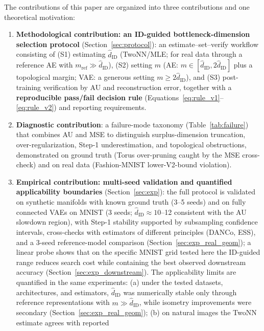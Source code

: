 \documentclass[make,article,submit,pdftex,moreauthors]{Definitions/mdpi}
\newcommand{\hatdID}{\hat{d}_{\mathrm{ID}}}
\begin{document}
The contributions of this paper are organized into three contributions and
one theoretical motivation:
\begin{enumerate}
  \item \textbf{Methodological contribution: an ID-guided
        bottleneck-dimension selection protocol}
        (Section~\ref{sec:protocol}): an estimate--set--verify workflow
        consisting of
        (S1) estimating $\hatdID$ (TwoNN/MLE; for real data through a
        reference AE with $m_{\mathrm{ref}} \gg \hatdID$),
        (S2) setting $m$ (AE: $m \in [\hatdID, 2\hatdID]$ plus a topological
        margin; VAE: a generous setting $m \geq 2\hatdID$), and
        (S3) post-training verification by AU and reconstruction error,
        together with a \textbf{reproducible pass/fail decision rule}
        (Equations~\eqref{eq:rule_v1}--\eqref{eq:rule_v2}) and reporting
        requirements.
  \item \textbf{Diagnostic contribution}: a failure-mode taxonomy
        (Table~\ref{tab:failure}) that combines AU and MSE to distinguish
        surplus-dimension truncation, over-regularization, Step-1
        underestimation, and topological obstructions, demonstrated on
        ground truth (Torus over-pruning caught by the MSE cross-check) and
        on real data (Fashion-MNIST lower-V2-bound violation).
  \item \textbf{Empirical contribution: multi-seed validation and
        quantified applicability boundaries} (Section~\ref{sec:exp}):
        the full protocol is validated on synthetic manifolds with known
        ground truth (3--5 seeds) and on fully connected VAEs on MNIST
        (3 seeds; $\hatdID \approx 10$--12 consistent with the AU slowdown
        region), with Step-1 stability supported by subsampling confidence
        intervals, cross-checks with estimators of different principles
        (DANCo, ESS), and a 3-seed reference-model comparison
        (Section~\ref{sec:exp_real_geom}); a linear probe shows that on the
        specific MNIST grid tested here the ID-guided range reduces search
        cost while containing the best observed downstream accuracy
        (Section~\ref{sec:exp_downstream}).
        The applicability limits are quantified in the same experiments:
        (a) under the tested datasets, architectures, and estimators,
        $\hatdID$ was numerically stable only through reference
        representations with $m \gg \hatdID$, while isometry improvements
        were secondary (Section~\ref{sec:exp_real_geom});
        (b) on natural images the TwoNN estimate agrees with reported

\end{enumerate}
\end{document}

